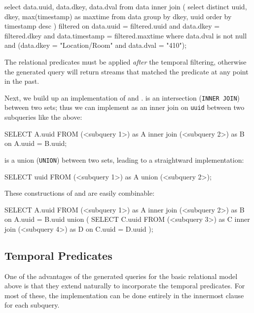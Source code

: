 \begin{sqlcode}
select data.uuid, data.dkey, data.dval
from data
inner join
(
    select distinct uuid, dkey, max(timestamp) as maxtime
    from data
    group by dkey, uuid order by timestamp desc
) filtered
on
    data.uuid = filtered.uuid
    and data.dkey = filtered.dkey
    and data.timestamp = filtered.maxtime
where data.dval is not null
and (data.dkey = "Location/Room" and data.dval = "410");
\end{sqlcode}

The relational predicates must be applied \emph{after} the temporal filtering,
otherwise the generated query will return streams that matched the predicate at
any point in the past.

Next, we build up an implementation of  and . 
is an intersection (\texttt{INNER JOIN}) between two sets; thus we can implement 
as an inner join on \texttt{uuid} between two subqueries like the above:

\begin{sqlcode}
SELECT A.uuid FROM
(<subquery 1>) as A
inner join
(<subquery 2>) as B
on
A.uuid = B.uuid;
\end{sqlcode}

 is a union (\texttt{UNION}) between two sets, leading to a straightward implementation:

\begin{sqlcode}
SELECT uuid FROM
(<subquery 1>) as A
union
(<subquery 2>);
\end{sqlcode}

These constructions of  and  are easily combinable:

\begin{sqlcode}

SELECT A.uuid FROM
(<subquery 1>) as A
inner join
(<subquery 2>) as B
on A.uuid = B.uuid
union
(
  SELECT C.uuid FROM
  (<subquery 3>) as C
  inner join
  (<subquery 4>) as D
  on C.uuid = D.uuid
);
\end{sqlcode}

\subsection{Temporal Predicates}

One of the advantages of the generated queries for the basic relational model above is that they extend naturally to incorporate
the temporal predicates. For most of these, the implementation can be done entirely in the innermost 
clause for each subquery.

